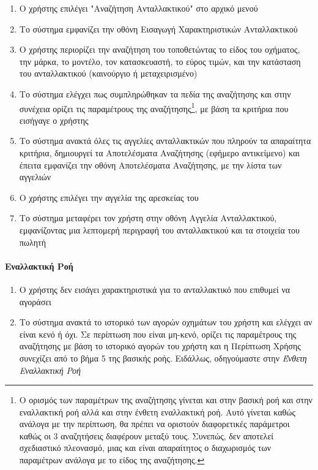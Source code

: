 \documentclass{../ol-softwaremanual}
\begin{document}
	\begin{enumerate}
		\item Ο χρήστης επιλέγει \en"\gr Αναζήτηση Ανταλλακτικού\en" \gr στο αρχικό μενού
		\item Το σύστημα εμφανίζει την οθόνη Εισαγωγή Χαρακτηριστικών Ανταλλακτικού
		\item Ο χρήστης περιορίζει την αναζήτηση του τοποθετώντας το είδος του οχήματος, την μάρκα, το μοντέλο, τον κατασκευαστή, το εύρος τιμών, και την κατάσταση του ανταλλακτικού (καινούργιο ή μεταχειρισμένο) 
		\item Το σύστημα ελέγχει πως συμπληρώθηκαν τα πεδία της αναζήτησης και στην συνέχεια ορίζει τις παραμέτρους της αναζήτησης\footnote[1]{Ο ορισμός των παραμέτρων της αναζήτησης γίνεται και στην βασική ροή και στην εναλλακτική ροή αλλά και στην ένθετη εναλλακτική ροή. Αυτό γίνεται καθώς ανάλογα με την περίπτωση, θα πρέπει να οριστούν διαφορετικές παράμετροι καθώς οι 3 αναζητήσεις διαφέρουν μεταξύ τους. Συνεπώς, δεν αποτελεί σχεδιαστικό πλεονασμό, μιας και είναι απαραίτητος ο διαχωρισμός των παραμέτρων ανάλογα με το είδος της αναζήτησης.}, με βάση τα κριτήρια που εισήγαγε ο χρήστης
		\item Το σύστημα ανακτά όλες τις αγγελίες ανταλλακτικών που πληρούν τα απαραίτητα κριτήρια, δημιουργεί τα Αποτελέσματα Αναζήτησης (εφήμερο αντικείμενο) και έπειτα εμφανίζει την οθόνη Αποτελέσματα Αναζήτησης, με την λίστα των αγγελιών
		\item Ο χρήστης επιλέγει την αγγελία της αρεσκείας του
		\item Το σύστημα μεταφέρει τον χρήστη στην οθόνη Αγγελία Ανταλλακτικού, εμφανίζοντας μια λεπτομερή περιγραφή του ανταλλακτικού και τα στοιχεία του πωλητή		
	\end{enumerate}
	
	\paragraph{Εναλλακτική Ροή}
	
	\begin{enumerate}
		\item Ο χρήστης δεν εισάγει χαρακτηριστικά για το ανταλλακτικό που επιθυμεί να αγοράσει
		\item Το σύστημα ανακτά το ιστορικό των αγορών οχημάτων του χρήστη και ελέγχει αν είναι κενό ή όχι. Σε περίπτωση που είναι μη-κενό, ορίζει τις παραμέτρους της αναζήτησης με βάση το ιστορικό αγορών του χρήστη και η Περίπτωση Χρήσης συνεχίζει από το βήμα 5 της βασικής ροής. Ειδάλλως, οδηγούμαστε στην \textit{Ένθετη Εναλλακτική Ροή}	
	\end{enumerate}
	
\end{document}
